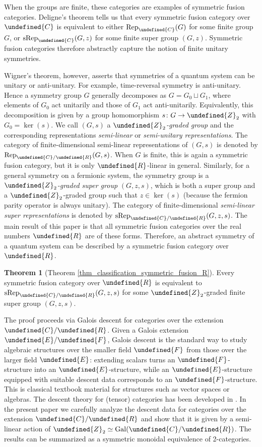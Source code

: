 \documentclass[10pt]{article}
\let\mathbb\undefined
\theoremstyle{definition}
\newtheorem{mainthm}{Theorem}
\numberwithin{equation}{section}
\numberwithin{thm}{section}
\newcommand{\Cb}{\mathbb{C}}
\newcommand{\Rb}{\mathbb{R}}
\newcommand{\Zb}{\mathbb{Z}}
\DeclareMathOperator{\Gal}{Gal}
\newcommand{\rep}{\mathrm{Rep}}
\newcommand{\srep}{\mathrm{sRep}}
\begin{document}
When the groups are finite, these categories are examples of symmetric fusion categories. Deligne's theorem \cite{Del90,Del02} tells us that every symmetric fusion category over $\Cb$ is equivalent to either $\rep_\Cb(G)$ for some finite group $G$, or $\srep_\Cb(G,z)$ for some finite super group $(G,z)$. Symmetric fusion categories therefore abstractly capture the notion of finite unitary symmetries.

Wigner's theorem, however, asserts that symmetries of a quantum system can be unitary or anti-unitary. For example, time-reversal symmetry is anti-unitary. Hence a symmetry group $G$ generally decomposes as $G = G_0 \sqcup G_1$, where elements of $G_0$ act unitarily and those of $G_1$ act anti-unitarily. Equivalently, this decomposition is given by a group homomorphism $s \colon G \to \Zb_2$ with $G_0 = \ker(s)$. We call $(G,s)$ a \emph{$\Zb_2$-graded group} and the corresponding representations \emph{semi-linear} or \emph{semi-unitary representations}. The category of finite-dimensional semi-linear representations of $(G,s)$ is denoted by $\rep_{\Cb/\Rb}(G,s)$. When $G$ is finite, this is again a symmetric fusion category, but it is only $\Rb$-linear in general. Similarly, for a general symmetry on a fermionic system, the symmetry group is a \emph{$\Zb_2$-graded super group} $(G,z,s)$, which is both a super group and a $\Zb_2$-graded group such that $z \in \ker(s)$ (because the fermion parity operator is always unitary). The category of finite-dimensional \emph{semi-linear super representations} is denoted by $\srep_{\Cb/\Rb}(G,z,s)$. The main result of this paper is that all symmetric fusion categories over the real numbers $\Rb$ are of these forms. Therefore, an abstract symmetry of a quantum system can be described by a symmetric fusion category over $\Rb$.

\begin{mainthm}[Theorem \ref{thm_classification_symmetric_fusion_R}]
Every symmetric fusion category over $\Rb$ is equivalent to $\srep_{\Cb/\Rb}(G,z,s)$ for some $\Zb_2$-graded finite super group $(G,z,s)$.
\end{mainthm}

The proof proceeds via Galois descent for categories over the extension $\Cb/\Rb$. Given a Galois extension $\mathbb{E}/\mathbb{F}$, Galois descent is the standard way to study algebraic structures over the smaller field $\mathbb{F}$ from those over the larger field $\mathbb{E}$: extending scalars turns an $\mathbb{F}$-structure into an $\mathbb{E}$-structure, while an $\mathbb{E}$-structure equipped with suitable descent data corresponds to an $\mathbb{F}$-structure. This is classical textbook material for structures such as vector spaces or algebras. The descent theory for (tensor) categories has been developed in \cite{EG11}. In the present paper we carefully analyze the descent data for categories over the extension $\Cb/\Rb$ and show that it is given by a semi-linear action of $\Zb_2 \simeq \Gal(\Cb/\Rb)$. The results can be summarized as a symmetric monoidal equivalence of 2-categories.
\end{document}
